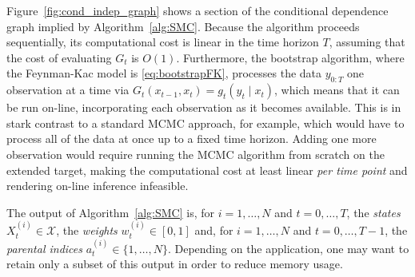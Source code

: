 Figure~\ref{fig:cond_indep_graph} shows a section of the conditional dependence graph implied by Algorithm~\ref{alg:SMC}.
Because the algorithm proceeds sequentially, its computational cost is linear in the time horizon $T$, assuming that the cost of evaluating $G_t$ is $O(1)$.
Furthermore, the bootstrap algorithm, where the Feynman-Kac model is \eqref{eq:bootstrapFK}, processes the data $y_{0:T}$ one observation at a time via $G_t(x_{t-1},x_t) = g_t(y_t \mid x_t)$, which means that it can be run on-line, incorporating each observation as it becomes available.
This is in stark contrast to a standard MCMC approach, for example, which would have to process all of the data at once up to a fixed time horizon. Adding one more observation would require running the MCMC algorithm from scratch on the extended target, making the computational cost at least linear \emph{per time point} and rendering on-line inference infeasible.

The output of Algorithm~\ref{alg:SMC} is, for $i=1,\dots, N$ and $t=0,\dots,T$, the \emph{states} $X_t^{(i)} \in \mathcal{X}$, the \emph{weights} $w_t^{(i)} \in [0,1]$ and, for $i=1,\dots, N$ and $t=0,\dots,T-1$, the \emph{parental indices} $a_t^{(i)} \in \{1,\dots,N\}$.
Depending on the application, one may want to retain only a subset of this output in order to reduce memory usage.

